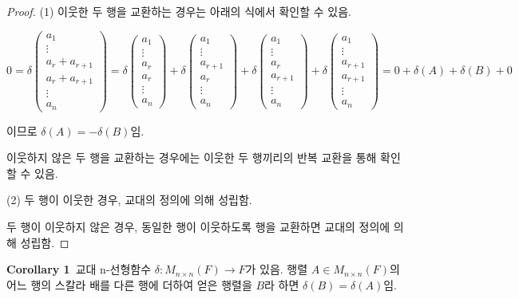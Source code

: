 \begin{proof}
(1) 이웃한 두 행을 교환하는 경우는 아래의 식에서 확인할 수 있음.

\[
0=\delta
\begin{pmatrix}
a_1\\
\vdots\\
a_r+a_{r+1}\\
a_r+a_{r+1}\\
\vdots\\
a_n
\end{pmatrix}
=\delta
\begin{pmatrix}
a_1\\
\vdots\\
a_r\\
a_r\\
\vdots\\
a_n
\end{pmatrix}
+\delta
\begin{pmatrix}
a_1\\
\vdots\\
a_{r+1}\\
a_r\\
\vdots\\
a_n
\end{pmatrix}
+\delta
\begin{pmatrix}
a_1\\
\vdots\\
a_r\\
a_{r+1}\\
\vdots\\
a_n
\end{pmatrix}
+\delta
\begin{pmatrix}
a_1\\
\vdots\\
a_{r+1}\\
a_{r+1}\\
\vdots\\
a_n
\end{pmatrix}
=0+\delta(A)+\delta(B)+0
\]

이므로 $\delta(A)=-\delta(B)$임.

이웃하지 않은 두 행을 교환하는 경우에는 이웃한 두 행끼리의 반복 교환을 통해 확인할 수 있음.

(2) 두 행이 이웃한 경우, 교대의 정의에 의해 성립함.

두 행이 이웃하지 않은 경우, 동일한 행이 이웃하도록 행을 교환하면 교대의 정의에 의해 성립함.
\end{proof}


\textbf{Corollary 1}\, 교대 n-선형함수 $\delta:M_{n \times n}(F) \rightarrow F$가 있음. 행렬 $A \in M_{n \times n}(F)$의 어느 행의 스칼라 배를 다른 행에 더하여 얻은 행렬을 $B$라 하면 $\delta(B)=\delta(A)$임.

